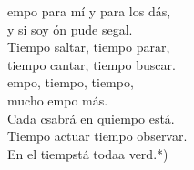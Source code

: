 \documentclass[12pt]{article}
\begin{document}
\begin{multicols*}{2}
\begin{cancion}
	\begin{chorus}%
	empo para mí y para los dás,\\
	y si soy ón pude segal.\\
	Tiempo  saltar, tiempo  parar,\\
	tiempo cantar, tiempo  buscar.\\
\jump
	empo, tiempo, tiempo,\\
	mucho empo más.\\
	Cada csabrá en quiempo está.\\
	Tiempo  actuar tiempo  observar.\\
	En el tiempstá todaa verd.*)\\
	\end{chorus}%
	\jump\\
\end{cancion}%


\end{multicols*}
\end{document}
